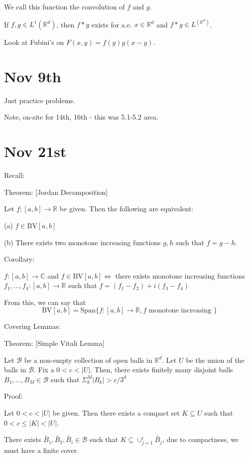 \documentclass[10pt]{article}
\newcommand{\bv}{{\text{BV}}}
\begin{document}
We call this function the convolution of $f$ and $g$.

If $f,g \in L^1(\mathbb{R}^d)$, then $f \ast g$ exists for a.e. $x \in \mathbb{R}^d$ and $f \ast g \in L^(\mathbb{R}^d)$.

Look at Fubini’s on $F(x,y) = f(y) g(x-y)$.

\section*{Nov 9th}

Just practice problems.

Note, on-site for 14th, 16th - this was 5.1-5.2 area.

\section*{Nov 21st}

Recall:

Theorem: [Jordan Decomposition]

Let $f: [a,b] \to \mathbb{R}$ be given. Then the following are equivalent:

(a) $f \in \bv[a,b]$

(b) There exists two monotone increasing functions $g,h$ such that $f = g -h$.

Corollary:

$f : [a,b] \to \mathbb{C}$ and $f \in \bv[a,b] \iff$ there exists monotone increasing functions $f_1,...,f_4: [a,b] \to \mathbb{R}$ such that $f = (f_1 - f_2) + i(f_3 - f_4)$

From this, we can say that $$\bv[a,b] = \text{Span}\{ f: [a,b] \to \mathbb{R}, f \text{ monotone increasing } \}$$

Covering Lemmas:

Theorem: [Simple Vitali Lemma]

Let $\mathcal{B}$ be a non-empty collection of open balls in $\mathbb{R}^d$. Let $U$ be the union of the balls in $\mathcal{B}$. Fix a $0 < c < |U|$. Then, there exists finitely many disjoint balls $B_1,...,B_M \in \mathcal{B}$ such that $\Sigma_k^M |B_k| > c/3^d$

Proof:

Let $ 0 < c < |U|$ be given. Then there exists a compact set $K \subseteq U$ such that $0 < c \leq |K| < |U|$.

There exists $\tilde{B_1}, \tilde{B_2}, \tilde{B_i} \in \mathcal{B}$ such that $K \subseteq \cup_{j=1}^i \tilde{B_j} $, due to compactness, we must have a finite cover.
\end{document}
